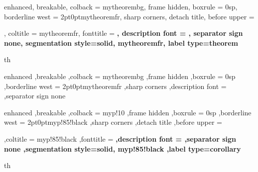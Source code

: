 \setlength{\parindent}{0.5cm}

{%
	enhanced,
	breakable,
	colback = mytheorembg,
	frame hidden,
	boxrule = 0sp,
	borderline west = {2pt}{0pt}{mytheoremfr},
	sharp corners,
	detach title,
	before upper = \tcbtitle\par\smallskip,
	coltitle = mytheoremfr,
	fonttitle = \bfseries\sffamily,
	description font = \mdseries,
	separator sign none,
	segmentation style={solid, mytheoremfr},
	label type=theorem
}
{th}



{%
	enhanced
	,breakable
	,colback = mytheorembg
	,frame hidden
	,boxrule = 0sp
	,borderline west = {2pt}{0pt}{mytheoremfr}
	,sharp corners
	,description font = \mdseries
	,separator sign none
}


{%
	enhanced
	,breakable
	,colback = myp!10
	,frame hidden
	,boxrule = 0sp
	,borderline west = {2pt}{0pt}{myp!85!black}
	,sharp corners
	,detach title
	,before upper = \tcbtitle\par\smallskip
	,coltitle = myp!85!black
	,fonttitle = \bfseries\sffamily
	,description font = \mdseries
	,separator sign none
	,segmentation style={solid, myp!85!black}
	,label type=corollary
}
{th}

